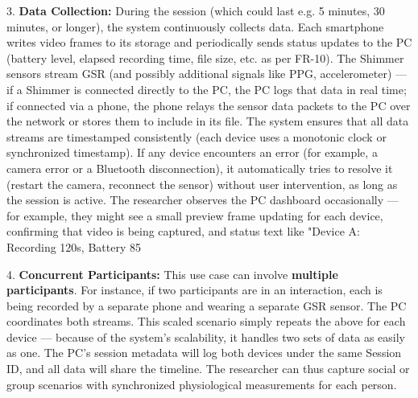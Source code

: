 \documentclass[11pt,a4paper]{report}
\begin{document}
3.  \textbf{Data Collection:} During the session (which could last e.g. 5
    minutes, 30 minutes, or longer), the system continuously collects
    data. Each smartphone writes video frames to its storage and
    periodically sends status updates to the PC (battery level, elapsed
    recording time, file size, etc. as per FR-10). The Shimmer sensors
    stream GSR (and possibly additional signals like PPG, accelerometer)
    --- if a Shimmer is connected directly to the PC, the PC logs that
    data in real time; if connected via a phone, the phone relays the
    sensor data packets to the PC over the network or stores them to
    include in its file. The system ensures that all data streams are
    timestamped consistently (each device uses a monotonic clock or
    synchronized timestamp). If any device encounters an error (for
    example, a camera error or a Bluetooth disconnection), it
    automatically tries to resolve it (restart the camera, reconnect the
    sensor) without user intervention, as long as the session is active.
    The researcher observes the PC dashboard occasionally --- for
    example, they might see a small preview frame updating for each
    device, confirming that video is being captured, and status text
    like "Device A: Recording 120s, Battery 85%

4.  \textbf{Concurrent Participants:} This use case can involve \textbf{multiple
    participants}. For instance, if two participants are in an
    interaction, each is being recorded by a separate phone and wearing
    a separate GSR sensor. The PC coordinates both streams. This scaled
    scenario simply repeats the above for each device --- because of the
    system's scalability, it handles two sets of data as easily as one.
    The PC's session metadata will log both devices under the same
    Session ID, and all data will share the timeline. The researcher can
    thus capture social or group scenarios with synchronized
    physiological measurements for each person.
\end{document}
